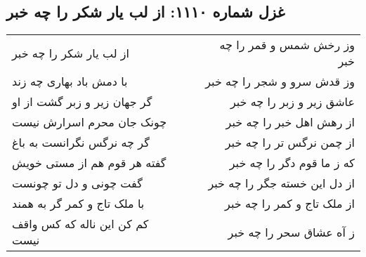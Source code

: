 \begin{center}
\section*{غزل شماره ۱۱۱۰: از لب یار شکر را چه خبر}
\label{sec:1110}
\begin{longtable}{l p{0.5cm} r}
از لب یار شکر را چه خبر
&&
وز رخش شمس و قمر را چه خبر
\\
با دمش باد بهاری چه زند
&&
وز قدش سرو و شجر را چه خبر
\\
گر جهان زیر و زبر گشت از او
&&
عاشق زیر و زبر را چه خبر
\\
چونک جان محرم اسرارش نیست
&&
از رهش اهل خبر را چه خبر
\\
گر چه نرگس نگرانست به باغ
&&
از چمن نرگس تر را چه خبر
\\
گفته هر قوم هم از مستی خویش
&&
که ز ما قوم دگر را چه خبر
\\
گفت چونی و دل تو چونست
&&
از دل این خسته جگر را چه خبر
\\
با ملک تاج و کمر گر به همند
&&
از ملک تاج و کمر را چه خبر
\\
کم کن این ناله که کس واقف نیست
&&
ز آه عشاق سحر را چه خبر
\\
\end{longtable}
\end{center}

